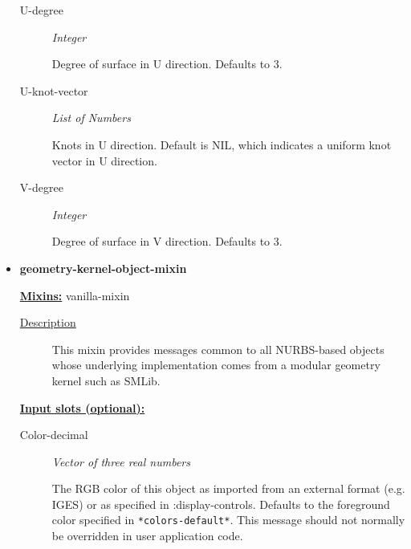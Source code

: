 \documentclass [11pt]{book}
\begin{document}
\begin{itemize}
\begin{description}
\item [U-degree]
\emph{Integer}

 Degree of surface in U direction. Defaults to 3.




\item [U-knot-vector]
\emph{List of Numbers}

 Knots in U direction. Default is NIL, which indicates a uniform knot vector in U direction.




\item [V-degree]
\emph{Integer}

 Degree of surface in V direction. Defaults to 3.




\end{description}







\item {}
\label{prim:geometry-kernel-object-mixin}
\textbf{geometry-kernel-object-mixin}


\textbf{
\underline{Mixins:}} vanilla-mixin





\begin{description}

\item [
\underline{Description}]


This mixin provides messages common to all NURBS-based objects whose underlying implementation
comes from a modular geometry kernel such as SMLib.



\end{description}








\textbf{
\underline{Input slots (optional):}}

\begin{description}

\item [Color-decimal]
\emph{Vector of three real numbers}

 The RGB color of this object as imported from an external format (e.g. IGES) or as specified in :display-controls.
Defaults to the foreground color specified in \texttt{*colors-default*}. This message should not normally be overridden in user application code.





\end{description}
\end{itemize}
\end{document}
